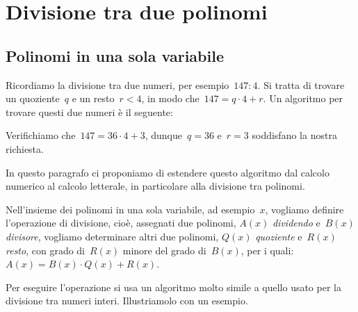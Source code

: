 
\chapter{Divisione tra due polinomi}

\section{Polinomi in una sola variabile}

Ricordiamo la divisione tra due numeri, per esempio~$147:4$. Si tratta di trovare un quoziente~$q$ e un resto~$r<4$, in modo 
che~$147=q\cdot 4+r$. Un algoritmo per trovare questi due numeri è il seguente:
\begin{center}
 
\end{center}
Verifichiamo che~$147=36\cdot 4+3$, dunque~$q=36$ e~$r=3$ soddisfano la nostra richiesta.

In questo paragrafo ci proponiamo di estendere questo algoritmo dal calcolo numerico al calcolo letterale, in particolare alla divisione tra polinomi.

Nell'insieme dei polinomi in una sola variabile, ad esempio~$x$, vogliamo definire l'operazione di divisione, cioè, assegnati
due polinomi, $A(x)$ \emph{dividendo} e~$B(x)$ \emph{divisore}, vogliamo determinare altri due polinomi, $Q(x)$ \emph{quoziente} e~$R(x)$ \emph{resto},
con grado di~$R(x)$ minore del grado di~$B(x)$, per i quali:~$A(x) = B(x){\cdot}Q(x) + R(x)$.

Per eseguire l'operazione si usa un algoritmo molto simile a quello usato per la divisione tra numeri interi. Illustriamolo con un esempio.


